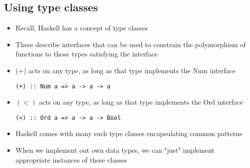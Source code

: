 \documentclass{article}[18pt]
\begin{document}
\subsection{Using type classes}
\begin{itemize}
	\item Recall, Haskell has a concept of type classes
	\item These describe interfaces that can be used to constrain the polymorphism of functions to those types satisfying the interface
	\item (+) acts on any type, as long as that type implements the Num interface
\begin{verbatim}
(+) :: Num a => a -> a -> a
\end{verbatim}
	\item $(<)$ acts on any type, as long as that type implements the Ord interface
\begin{verbatim}
(<) :: Ord a => a -> a -> Bool
\end{verbatim}
	\item Haskell comes with many such type classes encapsulating common patterns
	\item When we implement out own data types, we can "just" implement appropriate instances of these classes
\end{itemize}
\end{document}

